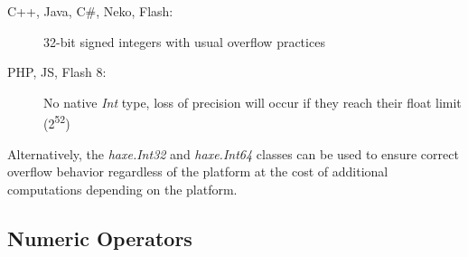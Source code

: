 \begin{description}
 \item[C++, Java, C\#, Neko, Flash:] 32-bit signed integers with usual overflow practices 
 \item[PHP, JS, Flash 8:] No native \emph{Int} type, loss of precision will occur if they reach their float limit (2\textsuperscript{52})
\end{description}

Alternatively, the \emph{haxe.Int32} and \emph{haxe.Int64} classes can be used to ensure correct overflow behavior regardless of the platform at the cost of additional computations depending on the platform.

\subsection{Numeric Operators}
\label{types-numeric-operators}


